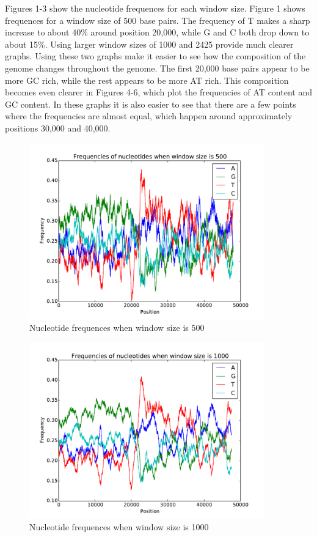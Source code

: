 \documentclass{acm_proc_article-sp}
\begin{document}
Figures 1-3 show the nucleotide frequences for each window size.  Figure 1 shows frequences for a window size of 500 base pairs. The frequency of T makes a sharp increase to about 40\% around position 20,000, while G and C both drop down to about 15\%. Using larger window sizes of 1000 and 2425 provide much clearer graphs.  Using these two graphs make it easier to see how the composition of the genome changes throughout the genome.  The first 20,000 base pairs appear to be more GC rich, while the rest appears to be more AT rich.  This composition becomes even clearer in Figures 4-6, which plot the frequencies of AT content and GC content.  In these graphs it is also easier to see that there are a few points where the frequencies are almost equal, which happen around approximately positions 30,000 and 40,000.  

\begin{figure}[t]
	\includegraphics[width=4in]{nuc-window-500.pdf}
	\caption{Nucleotide frequences when window size is 500}
	\label{fig:n500}
\end{figure}
\begin{figure}[t]
	\includegraphics[width=4in]{nuc-window-1000.pdf}
	\caption{Nucleotide frequences when window size is 1000}
	\label{fig:n1000}
\end{figure}
\end{document}
